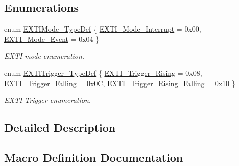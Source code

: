 \subsection*{Enumerations}
\begin{DoxyCompactItemize}
\item 
enum \hyperlink{group___e_x_t_i___exported___types_gad5e69af98dc0dfdf64417adc1cf57929}{E\+X\+T\+I\+Mode\+\_\+\+Type\+Def} \{ \hyperlink{group___e_x_t_i___exported___types_ggad5e69af98dc0dfdf64417adc1cf57929a8c6ccdd7b1bc4872731306537e8c3b42}{E\+X\+T\+I\+\_\+\+Mode\+\_\+\+Interrupt} = 0x00, 
\hyperlink{group___e_x_t_i___exported___types_ggad5e69af98dc0dfdf64417adc1cf57929aa38ef186929ec74786df79877ea124a7}{E\+X\+T\+I\+\_\+\+Mode\+\_\+\+Event} = 0x04
 \}\begin{DoxyCompactList}\small\item\em E\+X\+TI mode enumeration. \end{DoxyCompactList}
\item 
enum \hyperlink{group___e_x_t_i___exported___types_ga9da190f5425d1b421a06bced8cc48e9b}{E\+X\+T\+I\+Trigger\+\_\+\+Type\+Def} \{ \hyperlink{group___e_x_t_i___exported___types_gga9da190f5425d1b421a06bced8cc48e9baaa73605adf491dbe97994612e228af5e}{E\+X\+T\+I\+\_\+\+Trigger\+\_\+\+Rising} = 0x08, 
\hyperlink{group___e_x_t_i___exported___types_gga9da190f5425d1b421a06bced8cc48e9bac4a21d397aa4648b8f8cf961f71f3ac5}{E\+X\+T\+I\+\_\+\+Trigger\+\_\+\+Falling} = 0x0C, 
\hyperlink{group___e_x_t_i___exported___types_gga9da190f5425d1b421a06bced8cc48e9bab09db55a2e9118e86d03d69698434ebb}{E\+X\+T\+I\+\_\+\+Trigger\+\_\+\+Rising\+\_\+\+Falling} = 0x10
 \}\begin{DoxyCompactList}\small\item\em E\+X\+TI Trigger enumeration. \end{DoxyCompactList}
\end{DoxyCompactItemize}


\subsection{Detailed Description}


\subsection{Macro Definition Documentation}
\mbox{\label{group___e_x_t_i___exported___types_ga8429170f3320b90227f9f5b252c1c5eb}} 
